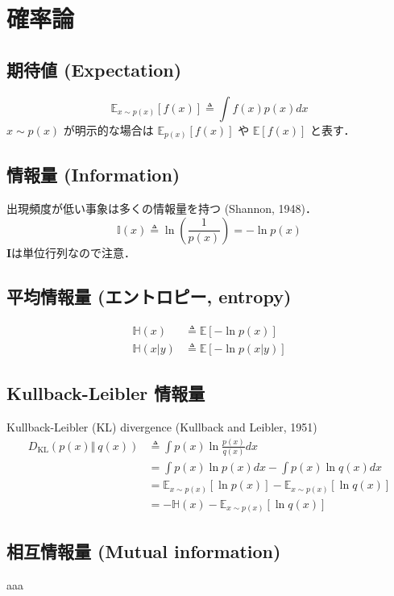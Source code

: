 \section{確率論}
\subsection{期待値 (Expectation)}
\begin{equation}
\mathbb{E}_{x\sim p(x)}\left[f(x)\right]\triangleq\int f(x)p(x)dx
\end{equation}
$x\sim p(x)$ が明示的な場合は $\mathbb{E}_{p(x)}\left[f(x)\right]$ や $\mathbb{E}\left[f(x)\right]$ と表す．
\subsection{情報量 (Information)}
出現頻度が低い事象は多くの情報量を持つ (Shannon, 1948)．
\begin{equation}
\mathbb{I}(x)\triangleq\ln\left(\frac{1}{p(x)}\right)=-\ln p(x)
\end{equation}
$\mathbf{I}$は単位行列なので注意．
\subsection{平均情報量 (エントロピー, entropy)}
\begin{align}
\mathbb{H}(x)&\triangleq\mathbb{E}[-\ln p(x)]\\
\mathbb{H}(x\vert y)&\triangleq\mathbb{E}[-\ln p(x\vert y)]
\end{align}
\subsection{Kullback-Leibler 情報量}
Kullback-Leibler (KL) divergence (Kullback and Leibler, 1951)
\begin{align}
D_{\text{KL}}\left(p(x) \Vert\ q(x)\right)&\triangleq\int p(x) \ln \frac{p(x)}{q(x)} dx\\
&=\int p(x) \ln p(x) dx-\int p(x) \ln q(x) dx\\
&=\mathbb{E}_{x\sim p(x)}[\ln p(x)]-\mathbb{E}_{x\sim p(x)}[\ln q(x)]\\
&=-\mathbb{H}(x)-\mathbb{E}_{x\sim p(x)}[\ln q(x)]
\end{align}
\subsection{相互情報量 (Mutual information)}
aaa

